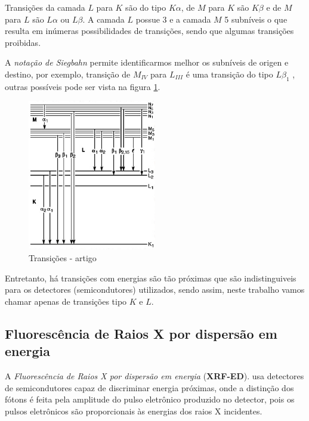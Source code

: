 Transições da camada $L$ para $K$ são do tipo $K\alpha$, de $M$ para $K$ 
são $K\beta$ e de $M$ para $L$ são $L\alpha$ ou $L\beta$. 
A camada $L$ possue 3 e a camada $M$ 5 subníveis o que
resulta em inúmeras possibilidades de transições, sendo que algumas transições
proibidas. 

A \textit{notação de Siegbahn} permite identificarmos melhor os subníveis
de origen e destino, por exemplo, transição de $M_{IV}$ para $L_{III}$ é uma transição do 
tipo $L\beta_1$ \cite{jenkins1991}, outras possíveis pode ser vista na
figura \ref{fig:siegbahn}. 

\begin{figure}[H]
\begin{center} 
  \includegraphics[width=0.5\textwidth]{../inputs/images/Siegbahn.jpg}
  \caption{Transições - artigo \cite{jenkins1991}  \label{fig:siegbahn}}
\end{center}
\end{figure}

Entretanto, há transições com energias são tão próximas 
que são indistinguiveis para os detectores (semicondutores) 
utilizados, sendo assim, neste trabalho vamos chamar apenas de 
transições tipo $K$ e $L$.

\subsection{Fluorescência de Raios X por dispersão em energia}

A \textit{Fluorescência de Raios X por dispersão em energia} (\textbf{XRF-ED}).
usa detectores de semicondutores capaz de discriminar energia 
próximas, onde a distinção dos fótons é feita pela amplitude do pulso 
eletrônico produzido no detector, pois os pulsos eletrônicos são
proporcionais às energias dos raios X incidentes. 

